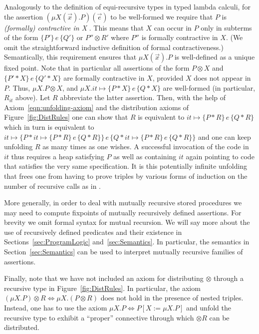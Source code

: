 \documentclass{LMCS}
\theoremstyle{remark}
\newcommand{\triple}[3]{{\ensuremath{\!\left.\{ #1 \}\, #2\, \{  #3 \}\!\right.}}}
\newcommand{\pointsto}{\ensuremath{\mapsto}}
\begin{document}
Analogously to the definition of equi-recursive types in typed lambda calculi,  for the assertion $(\mu X(\vec x).P)(\vec e)$ to be well-formed we require that $P$ is \emph{(formally) contractive in X} \cite{Pierce:02}. This means that $X$ can occur in $P$ only in subterms of the form $\triple{P'}{e}{Q'}$ or $P''\otimes R'$ where $P''$ is formally contractive in $X$. (We omit the straightforward inductive definition of formal contractiveness.) 
Semantically, this requirement ensures that  $\mu X(\vec x).P$ is well-defined as a unique fixed point. 
Note that in particular all assertions of the form $P\otimes X$ and $\triple{P'*X}{e}{Q'*X}$ 
are formally contractive in $X$, provided $X$ does not appear in $P$. 
Thus,  $\mu X. P\otimes X$, and $\mu X. \mathit{it} {\pointsto} \triple{P*X}{e}{Q*X}$ are well-formed (in particular, $R_{\mathit{it}}$ above). 
Let $R$  abbreviate  the latter assertion. Then, with the help of Axiom~\ref{eqn:unfolding-axiom} and the distribution axioms of Figure~\ref{fig:DistRules}
one can show that $R$ is equivalent to $\mathit{it} {\pointsto} \triple{P* R}{e}{Q*R}$ which in turn is  equivalent to
 $\mathit{it} {\pointsto} \triple{P*  \mathit{it} {\pointsto}   \triple{P*R}{e}{Q*R}}{e}{Q*   \mathit{it} {\pointsto}   \triple{P*R}{e}{Q*R}}$ and one can keep unfolding $R$ as many times as one wishes. A successful invocation of the code in $\mathit{it}$ thus requires a heap satisfying $P$ as well as containing  $\mathit{it}$ again pointing to  code that satisfies the very same specification. It is this potentially infinite unfolding that frees one from having to prove triples by  various forms of induction on the number of recursive calls as  in \cite{Honda:Yoshida:Berger:05,Birkedal:Reus:Schwinghammer:Yang:08}.


More generally, in order to deal with mutually recursive stored procedures we may need to compute fixpoints of  mutually recursively defined  assertions. 
For brevity we omit formal syntax for mutual recursion.  
We will say more about
the use of recursively defined predicates 
and their existence in Sections~\ref{sec:ProgramLogic} 
and~\ref{sec:Semantics}. 
In particular, the semantics in Section~\ref{sec:Semantics} can be used to interpret mutually recursive families of assertions. 

Finally, note that we have not included an axiom for distributing $\otimes$ through a recursive type in Figure~\ref{fig:DistRules}. In particular, the axiom 
$(\mu X .P)\otimes R \Leftrightarrow \mu X .(P\otimes R)$ 
does not hold in the presence of nested triples. 
Instead, one has to use the   axiom 
$\mu X .P \Leftrightarrow P[X:=\mu X.P]$ 
and unfold the recursive type to exhibit a ``proper'' connective through which $\otimes R$ can be distributed.   
  
\end{document}
